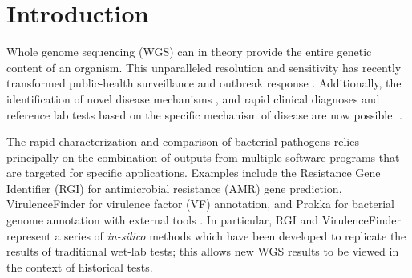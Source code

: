 \documentclass{article}
\begin{document}
\section{Introduction}

Whole genome sequencing (WGS) can in theory provide the entire genetic content of an organism. This unparalleled resolution and sensitivity has recently transformed public-health surveillance and outbreak response \cite{ronholm2016navigating,lytsy2017time}. Additionally, the identification of novel disease mechanisms \cite{wang2014whole,yuen2015whole}, and rapid clinical diagnoses and reference lab tests based on the specific mechanism of disease are now possible. \cite{willig2015whole,dewey2014clinical}.

The rapid characterization and comparison of bacterial pathogens relies principally on the combination of outputs from multiple software programs that are targeted for specific applications. Examples include the Resistance Gene Identifier (RGI) \cite{mcarthur2013comprehensive} for antimicrobial resistance (AMR) gene prediction, VirulenceFinder \cite{kleinheinz2014applying} for virulence factor (VF) annotation, and Prokka for bacterial genome annotation with external tools \cite{doi:10.1093/bioinformatics/btu153}. In particular, RGI and VirulenceFinder represent a series of \textit{in-silico} methods which have been developed to replicate the results of traditional wet-lab tests; this allows new WGS results to be viewed in the context of historical tests.
\end{document}
